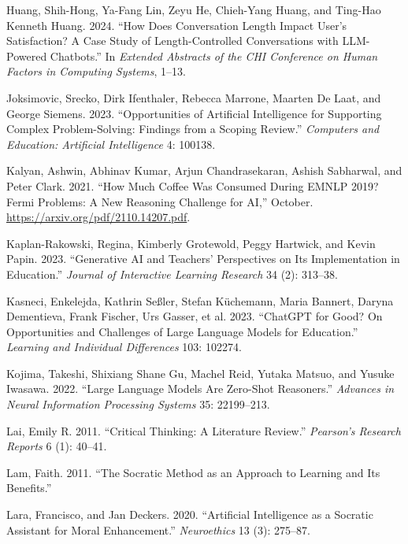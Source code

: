 \documentclass[
  11pt,
]{article}
\newlength{\cslhangindent}
\newenvironment{CSLReferences}[2] %
 {\begin{list}{}{%
  \setlength{\itemindent}{0pt}
  \setlength{\leftmargin}{0pt}
  \setlength{\parsep}{0pt}
  \ifodd #1
   \setlength{\leftmargin}{\cslhangindent}
   \setlength{\itemindent}{-1\cslhangindent}
  \fi
  \setlength{\itemsep}{#2\baselineskip}}}
 {\end{list}}
\begin{document}
\begin{CSLReferences}{1}{0}
Huang, Shih-Hong, Ya-Fang Lin, Zeyu He, Chieh-Yang Huang, and Ting-Hao Kenneth Huang. 2024. {``How Does Conversation Length Impact User's Satisfaction? A Case Study of Length-Controlled Conversations with LLM-Powered Chatbots.''} In \emph{Extended Abstracts of the CHI Conference on Human Factors in Computing Systems}, 1--13.

Joksimovic, Srecko, Dirk Ifenthaler, Rebecca Marrone, Maarten De Laat, and George Siemens. 2023. {``Opportunities of Artificial Intelligence for Supporting Complex Problem-Solving: Findings from a Scoping Review.''} \emph{Computers and Education: Artificial Intelligence} 4: 100138.

Kalyan, Ashwin, Abhinav Kumar, Arjun Chandrasekaran, Ashish Sabharwal, and Peter Clark. 2021. {``How Much Coffee Was Consumed During EMNLP 2019? Fermi Problems: A New Reasoning Challenge for AI,''} October. \url{https://arxiv.org/pdf/2110.14207.pdf}.

Kaplan-Rakowski, Regina, Kimberly Grotewold, Peggy Hartwick, and Kevin Papin. 2023. {``Generative AI and Teachers' Perspectives on Its Implementation in Education.''} \emph{Journal of Interactive Learning Research} 34 (2): 313--38.

Kasneci, Enkelejda, Kathrin Seßler, Stefan Küchemann, Maria Bannert, Daryna Dementieva, Frank Fischer, Urs Gasser, et al. 2023. {``ChatGPT for Good? On Opportunities and Challenges of Large Language Models for Education.''} \emph{Learning and Individual Differences} 103: 102274.

Kojima, Takeshi, Shixiang Shane Gu, Machel Reid, Yutaka Matsuo, and Yusuke Iwasawa. 2022. {``Large Language Models Are Zero-Shot Reasoners.''} \emph{Advances in Neural Information Processing Systems} 35: 22199--213.

Lai, Emily R. 2011. {``Critical Thinking: A Literature Review.''} \emph{Pearson's Research Reports} 6 (1): 40--41.

Lam, Faith. 2011. {``The Socratic Method as an Approach to Learning and Its Benefits.''}

Lara, Francisco, and Jan Deckers. 2020. {``Artificial Intelligence as a Socratic Assistant for Moral Enhancement.''} \emph{Neuroethics} 13 (3): 275--87.


\end{CSLReferences}
\end{document}

